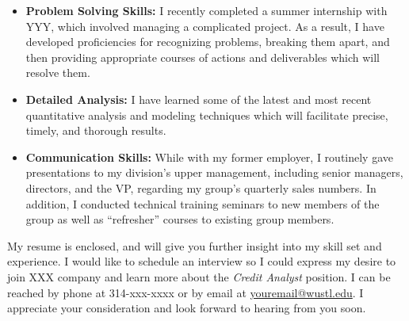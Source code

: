 \documentclass[11pt,a4paper,roman]{moderncv}
\begin{document}
\begin{itemize}
\item \textbf{Problem Solving Skills:} I recently completed a summer internship with YYY, which involved managing a complicated project. As a result, I have developed proficiencies for recognizing problems, breaking them apart, and then providing appropriate courses of actions and deliverables which will resolve them.\\

\item \textbf{Detailed Analysis:} I have learned some of the latest and most recent quantitative analysis and modeling techniques which will facilitate precise, timely, and thorough results.\\

\item \textbf{Communication Skills:} While with my former employer, I routinely gave presentations to my division’s upper management, including senior managers, directors, and the VP, regarding my group’s quarterly sales numbers. In addition, I conducted technical training seminars to new members of the group as well as “refresher” courses to existing group members.\\
\end{itemize}

My resume is enclosed, and will give you further insight into my skill set and experience. I would like to schedule an interview so I could express my desire to join XXX company and learn more about the \textit{Credit Analyst} position. I can be reached by phone at 314-xxx-xxxx or by email at  {\color{blue} \href{mailto:youremail@wustl.edu}{youremail@wustl.edu}}. I appreciate your consideration and look forward to hearing from you soon.

\vspace{0.5cm}

\makeletterclosing
\end{document}
